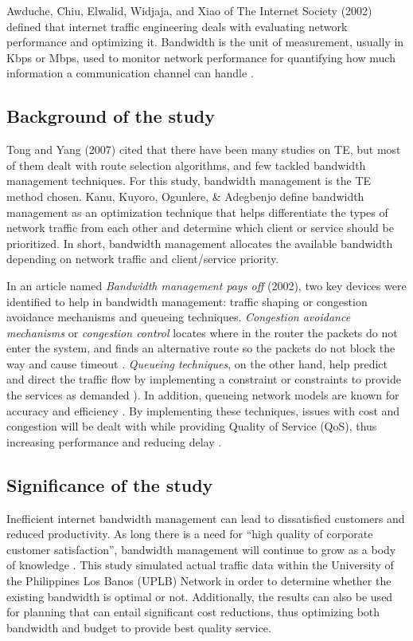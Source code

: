 \documentclass[journal]{IEEE/IEEEtran}
\begin{document}
Awduche, Chiu, Elwalid, Widjaja, and Xiao of The Internet Society (2002) \cite{awduche_chiu_elwalid_xiao_2002} defined that internet traffic engineering deals with evaluating network performance and optimizing it. Bandwidth is the unit of measurement, usually in Kbps or Mbps, used to monitor network performance for quantifying how much information a communication channel can handle \cite{teach_ict_nd}.

\subsection{Background of the study}
Tong and Yang (2007)\cite{tong_yang_2007} cited that there have been many studies on TE, but most of them dealt with route selection algorithms, and few tackled bandwidth management techniques. For this study, bandwidth management is the TE method chosen. Kanu, Kuyoro, Ogunlere, \& Adegbenjo \cite{kanu_kuyoro_ogunlere_adegbenjo_2012} define bandwidth management as an optimization technique that helps differentiate the types of network traffic from each other and determine which client or service should be prioritized. In short, bandwidth management allocates the available bandwidth depending on network traffic and client/service priority.

In an article named \textit{Bandwidth management pays off} (2002)\cite{communication_news_2001}, two key devices were identified to help in bandwidth management: traffic shaping or congestion avoidance mechanisms and queueing techniques. \textit{Congestion avoidance mechanisms} or \textit{congestion control} locates where in the router the packets do not enter the system, and finds an alternative route so the packets do not block the way and cause timeout \cite{jacobson_1988}. \textit{Queueing techniques}, on the other hand, help predict and direct the traffic flow by implementing a constraint or constraints to provide the services as demanded \cite{gross_harris_1974}). In addition, queueing network models are known for accuracy and efficiency \cite{lazowska_zahorjan_graham_sevcik_1984}. By implementing these techniques, issues with cost and congestion will be dealt with while providing Quality of Service (QoS), thus increasing performance and reducing delay \cite{paul_1999}.

\subsection{Significance of the study}
Inefficient internet bandwidth management can lead to dissatisfied customers and reduced productivity. As long there is a need for “high quality of corporate customer satisfaction”, bandwidth management will continue to grow as a body of knowledge \cite{duzbeck_2006}. This study simulated actual traffic data within the University of the Philippines Los Banos (UPLB) Network in order to determine whether the existing bandwidth is optimal or not. Additionally, the results can also be used for planning that can entail significant cost reductions, thus optimizing both bandwidth and budget to provide best quality service.
\end{document}
